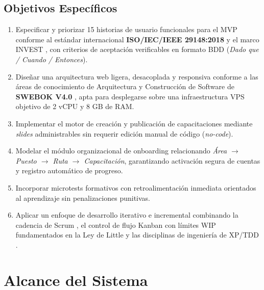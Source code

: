 \documentclass[11pt,a4paper]{article}
\begin{document}
\subsection{Objetivos Específicos}
\begin{enumerate}[leftmargin=*]
    \item Especificar y priorizar 15 historias de usuario funcionales para el MVP conforme al estándar internacional \textbf{ISO/IEC/IEEE 29148:2018} \cite{iso29148} y el marco INVEST \cite{cohn2004}, con criterios de aceptación verificables en formato BDD (\textit{Dado que / Cuando / Entonces}).
    \item Diseñar una arquitectura web ligera, desacoplada y responsiva conforme a las áreas de conocimiento de Arquitectura y Construcción de Software de \textbf{SWEBOK V4.0} \cite{swebok2024}, apta para desplegarse sobre una infraestructura VPS objetivo de 2 vCPU y 8 GB de RAM.
    \item Implementar el motor de creación y publicación de capacitaciones mediante \textit{slides} administrables sin requerir edición manual de código (\textit{no-code}).
    \item Modelar el módulo organizacional de onboarding relacionando \textit{Área $\rightarrow$ Puesto $\rightarrow$ Ruta $\rightarrow$ Capacitación}, garantizando activación segura de cuentas y registro automático de progreso.
    \item Incorporar microtests formativos con retroalimentación inmediata orientados al aprendizaje sin penalizaciones punitivas.
    \item Aplicar un enfoque de desarrollo iterativo e incremental combinando la cadencia de Scrum \cite{scrumguide2020}, el control de flujo Kanban con límites WIP fundamentados en la Ley de Little \cite{little1961, anderson2010} y las disciplinas de ingeniería de XP/TDD \cite{beck2000}.
\end{enumerate}

\section{Alcance del Sistema}
\end{document}
